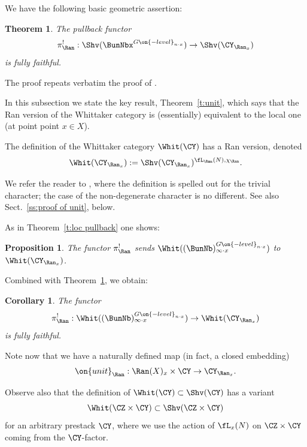 \documentclass[9pt]{amsart}
\newtheorem{cor}[subsubsection]{Corollary}
\newtheorem{prop}[subsubsection]{Proposition}
\newtheorem{thm}[subsubsection]{Theorem}
\theoremstyle{definition}
\theoremstyle{remark}
\newcommand{\thmref}[1]{Theorem~\ref{#1}}
\newcommand{\secref}[1]{Sect.~\ref{#1}}
\numberwithin{equation}{section}
\begin{document}
We have the following basic geometric assertion:

\begin{thm} \label{t:contr}
The pullback functor
$$\pi_\Ran^!:\Shv(\BunNbx^{G\on{-level}_{n\cdot x}})\to \Shv(\CY_{\Ran_x} )$$
is fully faithful. 
\end{thm}

The proof repeats verbatim the proof of \cite[Theorem 3.4.4]{Ga2}. 


In this subsection we state the key result, \thmref{t:unit}, which says that the Ran version of the
Whittaker category is (essentially) equivalent to the local one (at point point $x\in X$). 

\sssec{}

The definition of the Whittaker category $\Whit(\CY)$ has a Ran version, denoted 
$$\Whit(\CY_{\Ran_x} ):=\Shv(\CY_{\Ran_x} )^{\fL_\Ran(N),\chi_\Ran}.$$

We refer the reader to \cite[Sect. 1.2]{Ga2}, where the definition is spelled out for the trivial character; the case of
the non-degenerate character is no different. See also \secref{ss:proof of unit}, below. 

\medskip

As in \thmref{t:loc pullback} one shows:

\begin{prop} \label{p:Ran pullback}
The functor $\pi_\Ran^!$ sends $\Whit((\BunNb)^{G\on{-level}_{n\cdot x}}_{\infty\cdot x})$ to $\Whit(\CY_{\Ran_x} )$.
\end{prop}

Combined with \thmref{t:contr}, we obtain: 

\begin{cor}
The functor
$$\pi_\Ran^!:\Whit((\BunNb)^{G\on{-level}_{n\cdot x}}_{\infty\cdot x})\to \Whit(\CY_{\Ran_x} )$$
is fully faithful.
\end{cor}

\sssec{}

Note now that we have a naturally defined map (in fact, a closed embedding)
$$\on{unit}_\Ran:\Ran(X)_x\times \CY\to \CY_{\Ran_x} .$$

Observe also that the definition of $\Whit(\CY)\subset \Shv(\CY)$ has a variant 
$$\Whit(\CZ\times \CY)\subset \Shv(\CZ\times \CY)$$
for an arbitrary prestack $\CY$, where we use the action of $\fL_x(N)$ on $\CZ\times \CY$ coming from the $\CY$-factor.

\medskip
\end{document}
